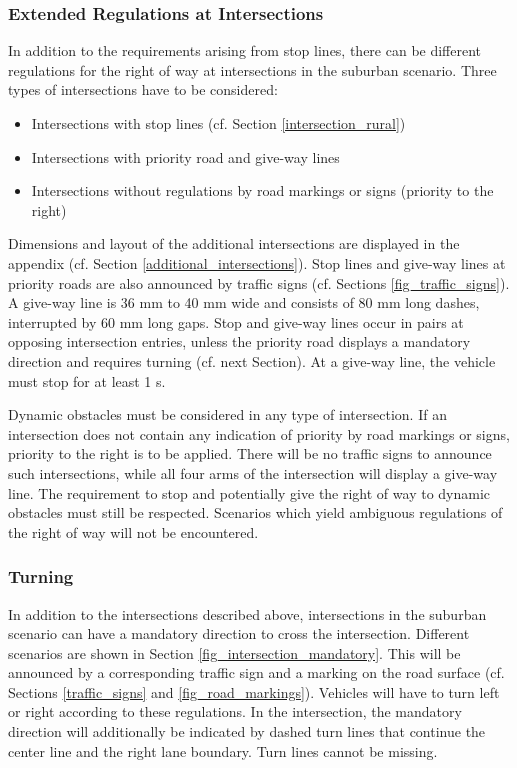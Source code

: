\documentclass[a4paper]{report}
\begin{document}
{{\subsubsection{Extended Regulations at Intersections}

In addition to the requirements arising from stop lines, there can be different regulations for the right of way at intersections in the suburban scenario. Three types of intersections have to be considered: 

\begin{itemize}
\item Intersections with stop lines (cf. Section \ref{intersection_rural}) 
\item Intersections with priority road and give-way lines 
\item Intersections without regulations by road markings or signs (priority to the right)
\end{itemize}

Dimensions and layout of the additional intersections are displayed in the appendix (cf. Section \ref{additional_intersections}). Stop lines and give-way lines at priority roads are also announced by traffic signs (cf. Sections \ref{fig_traffic_signs}). A give-way line is 36 mm to 40 mm wide and consists of 80 mm long dashes, interrupted by 60 mm long gaps. Stop and give-way lines occur in pairs at opposing intersection entries, unless the priority road displays a mandatory direction and requires turning (cf. next Section). At a give-way line, the vehicle must stop for at least 1 s. 

Dynamic obstacles must be considered in any type of intersection. If an intersection does not contain any indication of priority by road markings or signs, priority to the right is to be applied. There will be no traffic signs to announce such intersections, while all four arms of the intersection will display a give-way line. The requirement to stop and potentially give the right of way to dynamic obstacles must still be respected. Scenarios which yield ambiguous regulations of the right of way will not be encountered. 

\subsubsection{Turning}
\label{turning}

In addition to the intersections described above, intersections in the suburban scenario can have a mandatory direction to cross the intersection. Different scenarios are shown in Section \ref{fig_intersection_mandatory}. This will be announced by a corresponding traffic sign and a marking on the road surface (cf. Sections \ref{traffic_signs} and \ref{fig_road_markings}). Vehicles will have to turn left or right according to these regulations. In the intersection, the mandatory direction will additionally be indicated by dashed turn lines that continue the center line and the right lane boundary. Turn lines cannot be missing. 

}}
\end{document}
